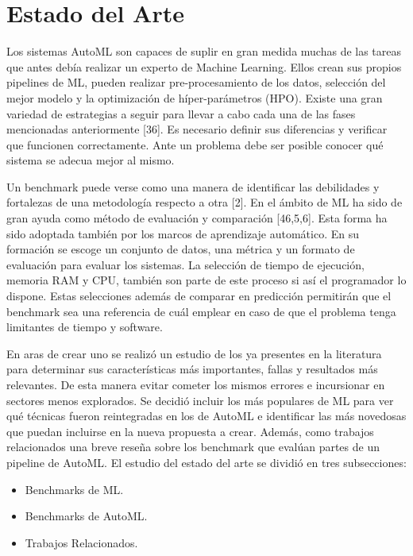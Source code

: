 \chapter{Estado del Arte}\label{chapter:state-of-the-art}

Los sistemas AutoML son capaces de suplir en gran medida muchas de las tareas que antes debía realizar un experto de Machine Learning. Ellos crean sus propios pipelines 
de ML, pueden realizar pre-procesamiento de los datos, selección del mejor modelo y la optimización de híper-parámetros (HPO). Existe una gran variedad de estrategias a 
seguir para llevar a cabo cada una de las fases mencionadas anteriormente [36]. Es necesario definir sus diferencias y verificar que funcionen correctamente. Ante un 
problema debe ser posible conocer qué sistema se adecua mejor al mismo.

Un benchmark puede verse como una manera de identificar las debilidades y fortalezas de una metodología respecto a otra [2]. En el ámbito de ML ha sido de gran ayuda 
como método de evaluación y comparación [46,5,6]. Esta forma ha sido adoptada también por los marcos de aprendizaje automático. En su formación se escoge un 
conjunto de datos, una métrica y un formato de evaluación para evaluar los sistemas. La selección de tiempo de ejecución, memoria RAM y CPU, también son parte de este 
proceso si así el programador lo dispone. Estas selecciones además de comparar en predicción permitirán que el benchmark sea una referencia de cuál emplear en caso de 
que el problema tenga limitantes de tiempo y software.

En aras de crear uno se realizó un estudio de los ya presentes en la literatura para determinar sus características más importantes, fallas y resultados más relevantes. 
De esta manera evitar cometer los mismos errores e incursionar en sectores menos explorados. Se decidió incluir los más populares de ML para ver qué técnicas fueron 
reintegradas en los de AutoML e identificar las más novedosas que puedan incluirse en la nueva propuesta a crear. Además, como trabajos relacionados una breve reseña 
sobre los benchmark que evalúan partes de un pipeline de AutoML. El estudio del estado del arte se dividió en tres subsecciones:

\begin{itemize}
\item Benchmarks de ML. 
\item Benchmarks de AutoML.
\item Trabajos Relacionados.
\end{itemize}
